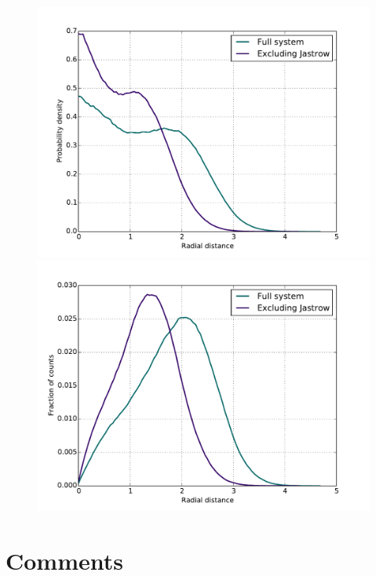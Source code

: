 \documentclass[english, a4paper]{article}
\begin{document}
\begin{figure}
		{\includegraphics[scale=0.43]{figures/radialDistribution/OneBodyDensityN12w100Se7.pdf}}
		{\includegraphics[scale=0.43]{figures/radialDistribution/radialDistributionN12w100Se7.pdf}}
	\end{figure}
	
	
	
	\section{Comments}
	
	
\end{document}
